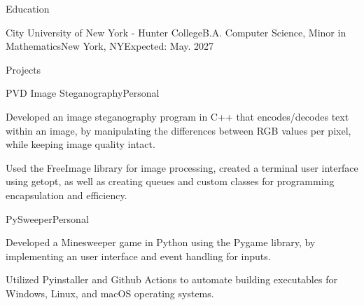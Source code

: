 \documentclass[]{rh-resume}
\begin{document}
\resumeheader
{}
{}
{}
{}
{}

\begin{section}{Education}
    \begin{subsectionnobullet}{City University of New York - Hunter College}{B.A. Computer Science, Minor in Mathematics}{New York, NY}{Expected: May. 2027}
    \end{subsectionnobullet}
\end{section}



\begin{section}{Projects}

\begin{subsectionproject}{PVD Image Steganography}{Personal}{}
    \item{Developed an image steganography program in C++ that encodes/decodes text within an image, by manipulating the differences between RGB values per pixel, while keeping image quality intact.}
    \item{Used the FreeImage library for image processing, created a terminal user interface using getopt, as well as creating queues and custom classes for programming encapsulation and efficiency.}
\end{subsectionproject}

\begin{subsectionproject}{PySweeper}{Personal}{}
    \item{Developed a Minesweeper game in Python using the Pygame library, by implementing an user interface and event handling for inputs.}
    \item{Utilized Pyinstaller and Github Actions to automate building executables for Windows, Linux, and macOS operating systems.}
\end{subsectionproject}

\end{section}

\end{document}
